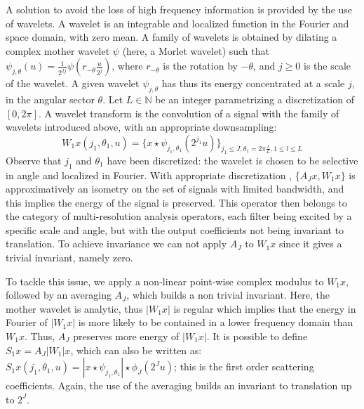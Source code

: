 \documentclass[10pt,twocolumn,letterpaper]{article}
\newcommand{\citep}{\cite}
\begin{document}
A solution to avoid the loss of high frequency information is provided by the use of wavelets. A wavelet is an integrable and localized function in the Fourier and space domain, with zero mean. A family of wavelets is obtained by dilating a complex mother wavelet $\psi$ (here, a Morlet wavelet) such that $\psi_{j,\theta}(u)=\frac 1 {2^{2j}}\psi(r_{-\theta}\frac{u}{2^j})$, where $r_{-\theta}$ is the rotation by $-\theta$, and $j\geq 0$ is the scale of the wavelet. A given wavelet $\psi_{j,\theta}$ has thus its energy concentrated at a scale $j$, in the angular sector $\theta$. Let $L\in \mathbb{N}$ be an integer parametrizing a discretization of $[0,2\pi]$. A wavelet transform is the convolution of a signal with the family of wavelets introduced above, with an appropriate downsampling:
\begin{equation*}
W_1x(j_1,\theta_1,u)=\{x\star \psi_{j_1,\theta_1}(2^{j_1}u)\}_{j_1\leq J,\theta_1=2\pi\frac{l}{L},1\leq l\leq L}
\end{equation*}
Observe that $j_1$ and $\theta_1$ have been discretized: the wavelet is chosen to be selective in angle and localized in Fourier. 
With appropriate discretization \cite{oyallon2015deep}, $\{A_Jx,W_1x\}$ is approximatively an isometry on the set of signals with limited bandwidth, and this implies the energy of the signal is preserved. This operator then belongs to the category of multi-resolution analysis operators, each filter being excited by a specific scale and angle, but with the output coefficients not being invariant to translation. To achieve invariance we can not apply $A_J$ to $W_1x$ since it gives a trivial invariant, namely zero.



To tackle this issue, we apply a non-linear point-wise complex modulus to $W_1x$, followed by an averaging $A_J$, which builds a non trivial invariant. Here, the mother wavelet is analytic, thus $|W_1x|$ is  regular \citep{bernstein2013generalized} which implies that the energy in Fourier of $|W_1x|$ is more likely to be contained in a lower frequency domain than $W_1x$. Thus, $A_J$ preserves more energy of $|W_1x|$. It is possible to define $S_1x=A_J|W_1|x$, which can also be written as: $S_1x(j_1,\theta_1,u)=|x\star\psi_{j_1,\theta_1}|\star\phi_J(2^Ju)$; this is the first order scattering coefficients. Again, the use of the averaging  builds an invariant to translation up to $2^J$.
\end{document}
